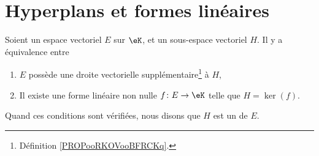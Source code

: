 
\section{Hyperplans et formes linéaires}

\begin{propositionDef}      \label{DEFooEWDTooQbUQws}
	Soient un espace vectoriel \( E\) sur \( \eK\), et un sous-espace vectoriel \( H\). Il y a équivalence entre
	\begin{enumerate}
		\item		\label{ITEMooUCWQooToKrop}
		      \( E\) possède une droite vectorielle supplémentaire\footnote{Définition \ref{PROPooRKOVooBFRCKq}.} à \( H\),
		\item		\label{ITEMooXVIPooNxijzA}
		      Il existe une forme linéaire non nulle \(f \colon E\to \eK  \) telle que \( H=\ker(f)\).
	\end{enumerate}
	Quand ces conditions sont vérifiées, nous disons que \( H\) est un  de \( E\).
\end{propositionDef}

